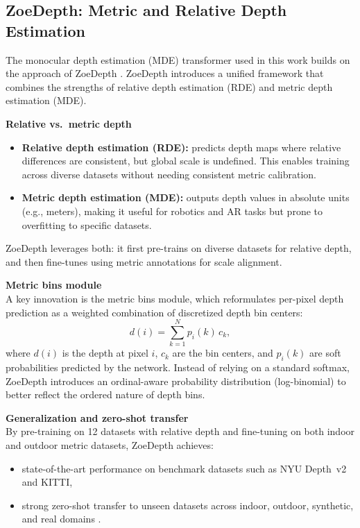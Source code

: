 \subsection{ZoeDepth: Metric and Relative Depth Estimation}
\label{appendix:zoedepth}

The monocular depth estimation (MDE) transformer used in this work builds on the approach of ZoeDepth \cite{bhat2023zoedepth}. ZoeDepth introduces a unified framework that combines the strengths of relative depth estimation (RDE) and metric depth estimation (MDE).

\textbf{Relative vs.\ metric depth} \\
\begin{itemize}
    \item \textbf{Relative depth estimation (RDE):} predicts depth maps where relative differences are consistent, but global scale is undefined. This enables training across diverse datasets without needing consistent metric calibration.
    \item \textbf{Metric depth estimation (MDE):} outputs depth values in absolute units (e.g., meters), making it useful for robotics and AR tasks but prone to overfitting to specific datasets.
\end{itemize}

ZoeDepth leverages both: it first pre-trains on diverse datasets for relative depth, and then fine-tunes using metric annotations for scale alignment.

\textbf{Metric bins module} \\
A key innovation is the metric bins module, which reformulates per-pixel depth prediction as a weighted combination of discretized depth bin centers:
\[
d(i) = \sum_{k=1}^{N} p_i(k)\,c_k,
\]
where $d(i)$ is the depth at pixel $i$, $c_k$ are the bin centers, and $p_i(k)$ are soft probabilities predicted by the network. Instead of relying on a standard softmax, ZoeDepth introduces an ordinal-aware probability distribution (log-binomial) to better reflect the ordered nature of depth bins.

\textbf{Generalization and zero-shot transfer} \\
By pre-training on 12 datasets with relative depth and fine-tuning on both indoor and outdoor metric datasets, ZoeDepth achieves:
\begin{itemize}
    \item state-of-the-art performance on benchmark datasets such as NYU Depth~v2 and KITTI,
    \item strong zero-shot transfer to unseen datasets across indoor, outdoor, synthetic, and real domains \cite{bhat2023zoedepth}.
\end{itemize}

